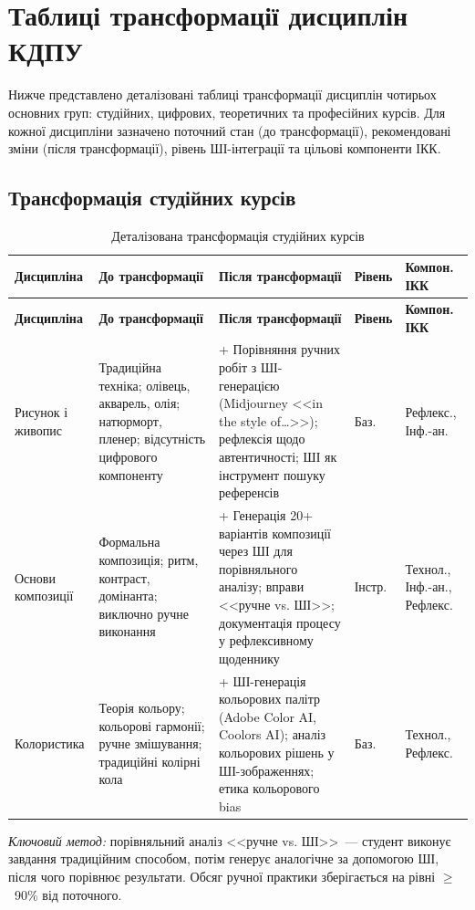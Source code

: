 \section{Таблиці трансформації дисциплін КДПУ}\label{app:transforms}

Нижче представлено деталізовані таблиці трансформації дисциплін чотирьох основних груп: студійних, цифрових, теоретичних та професійних курсів. Для кожної дисципліни зазначено поточний стан (до трансформації), рекомендовані зміни (після трансформації), рівень ШІ-інтеграції та цільові компоненти ІКК.

\subsection{Трансформація студійних курсів}

\begin{longtable}{@{}p{}p{}p{}p{}p{}@{}}
\caption{Деталізована трансформація студійних курсів}\label{tab:app-studio} \\
\hline
\textbf{Дисципліна} & \textbf{До трансформації} & \textbf{Після трансформації} & \textbf{Рівень} & \textbf{Компон. ІКК} \\
\hline
\endfirsthead
\hline
\textbf{Дисципліна} & \textbf{До трансформації} & \textbf{Після трансформації} & \textbf{Рівень} & \textbf{Компон. ІКК} \\
\hline
\endhead
Рисунок і живопис & Традиційна техніка; олівець, акварель, олія; натюрморт, пленер; відсутність цифрового компоненту & + Порівняння ручних робіт з ШІ-генерацією (Midjourney <<in the style of\ldots>>); рефлексія щодо автентичності; ШІ як інструмент пошуку референсів & Баз. & Рефлекс., Інф.-ан. \\
\addlinespace
Основи композиції & Формальна композиція; ритм, контраст, домінанта; виключно ручне виконання & + Генерація 20+ варіантів композиції через ШІ для порівняльного аналізу; вправи <<ручне vs. ШІ>>; документація процесу у рефлексивному щоденнику & Інстр. & Технол., Інф.-ан., Рефлекс. \\
\addlinespace
Колористика & Теорія кольору; кольорові гармонії; ручне змішування; традиційні колірні кола & + ШІ-генерація кольорових палітр (Adobe Color AI, Coolors AI); аналіз кольорових рішень у ШІ-зображеннях; етика кольорового bias & Баз. & Технол., Рефлекс. \\
\hline
\end{longtable}

\textit{Ключовий метод:} порівняльний аналіз <<ручне vs. ШІ>>~--- студент виконує завдання традиційним способом, потім генерує аналогічне за допомогою ШІ, після чого порівнює результати. Обсяг ручної практики зберігається на рівні $\geq$~90\% від поточного.

